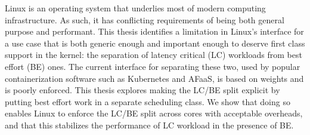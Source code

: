 %
%

Linux is an operating system that underlies most of modern computing
infrastructure. As such, it has conflicting requirements of being both general
purpose and performant. This thesis identifies a limitation in Linux's interface
for a use case that is both generic enough and important enough to deserve first
class support in the kernel: the separation of latency critical (LC) workloads
from best effort (BE) ones. The current interface for separating these two, used
by popular containerization software such as Kubernetes and AFaaS, is based on
weights and is poorly enforced. This thesis explores making the LC/BE split
explicit by putting best effort work in a separate scheduling class. We show
that doing so enables Linux to enforce the LC/BE split across cores with
acceptable overheads, and that this stabilizes the performance of LC workload in
the presence of BE.